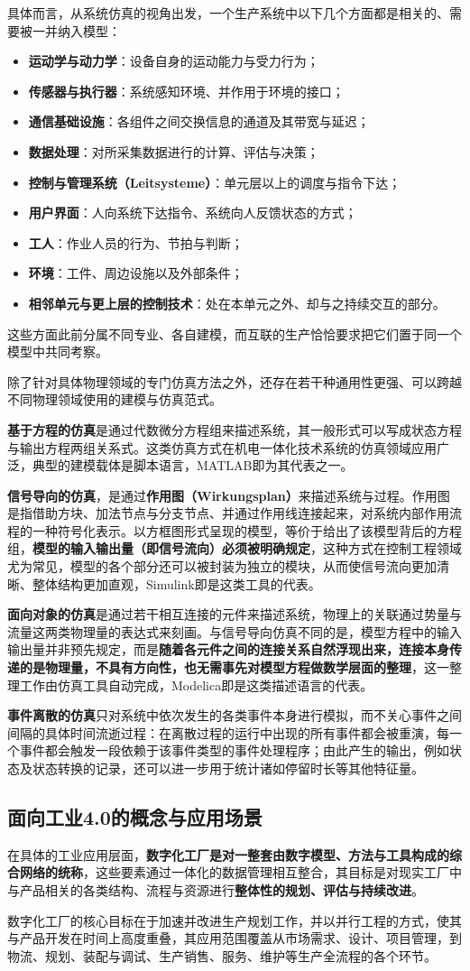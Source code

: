 具体而言，从系统仿真的视角出发，一个生产系统中以下几个方面都是相关的、需要被一并纳入模型：
\begin{itemize}
  \item \textbf{运动学与动力学}：设备自身的运动能力与受力行为；
  \item \textbf{传感器与执行器}：系统感知环境、并作用于环境的接口；
  \item \textbf{通信基础设施}：各组件之间交换信息的通道及其带宽与延迟；
  \item \textbf{数据处理}：对所采集数据进行的计算、评估与决策；
  \item \textbf{控制与管理系统（Leitsysteme）}：单元层以上的调度与指令下达；
  \item \textbf{用户界面}：人向系统下达指令、系统向人反馈状态的方式；
  \item \textbf{工人}：作业人员的行为、节拍与判断；
  \item \textbf{环境}：工件、周边设施以及外部条件；
  \item \textbf{相邻单元与更上层的控制技术}：处在本单元之外、却与之持续交互的部分。
\end{itemize}
这些方面此前分属不同专业、各自建模，而互联的生产恰恰要求把它们置于同一个模型中共同考察。

除了针对具体物理领域的专门仿真方法之外，还存在若干种通用性更强、可以跨越不同物理领域使用的建模与仿真范式。

\textbf{基于方程的仿真}是通过代数微分方程组来描述系统，其一般形式可以写成状态方程与输出方程两组关系式。这类仿真方式在机电一体化技术系统的仿真领域应用广泛，典型的建模载体是脚本语言，MATLAB即为其代表之一。

\textbf{信号导向的仿真}，是通过\textbf{作用图（Wirkungsplan）}来描述系统与过程。作用图是指借助方块、加法节点与分支节点、并通过作用线连接起来，对系统内部作用流程的一种符号化表示。以方框图形式呈现的模型，等价于给出了该模型背后的方程组，\textbf{模型的输入输出量（即信号流向）必须被明确规定}，这种方式在控制工程领域尤为常见，模型的各个部分还可以被封装为独立的模块，从而使信号流向更加清晰、整体结构更加直观，Simulink即是这类工具的代表。

\textbf{面向对象的仿真}是通过若干相互连接的元件来描述系统，物理上的关联通过势量与流量这两类物理量的表达式来刻画。与信号导向仿真不同的是，模型方程中的输入输出量并非预先规定，而是\textbf{随着各元件之间的连接关系自然浮现出来，连接本身传递的是物理量，不具有方向性，也无需事先对模型方程做数学层面的整理}，这一整理工作由仿真工具自动完成，Modelica即是这类描述语言的代表。

\textbf{事件离散的仿真}只对系统中依次发生的各类事件本身进行模拟，而不关心事件之间间隔的具体时间流逝过程：在离散过程的运行中出现的所有事件都会被重演，每一个事件都会触发一段依赖于该事件类型的事件处理程序；由此产生的输出，例如状态及状态转换的记录，还可以进一步用于统计诸如停留时长等其他特征量。

\subsection{面向工业4.0的概念与应用场景}

在具体的工业应用层面，\textbf{数字化工厂是对一整套由数字模型、方法与工具构成的综合网络的统称}，这些要素通过一体化的数据管理相互整合，其目标是对现实工厂中与产品相关的各类结构、流程与资源进行\textbf{整体性的规划、评估与持续改进}。

数字化工厂的核心目标在于加速并改进生产规划工作，并以并行工程的方式，使其与产品开发在时间上高度重叠，其应用范围覆盖从市场需求、设计、项目管理，到物流、规划、装配与调试、生产销售、服务、维护等生产全流程的各个环节。